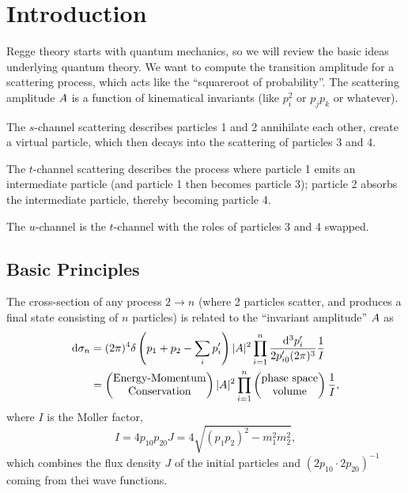 \chapter{Introduction}


\M
Regge theory starts with quantum mechanics, so we will review the basic
ideas underlying quantum theory. We want to compute the transition
amplitude for a scattering process, which acts like the ``squareroot of
probability''. The scattering amplitude $A$ is a function of
kinematical invariants (like $p_{i}^{2}$ or $p_{j}p_{k}$ or whatever).

The $s$-channel scattering describes particles 1 and 2 annihilate each
other, create a virtual particle, which then decays into the scattering
of particles 3 and 4.

The $t$-channel scattering describes the process where particle 1 emits
an intermediate particle (and particle 1 then becomes particle 3);
particle 2 absorbs the intermediate particle, thereby becoming particle
4.

The $u$-channel is the $t$-channel with the roles of particles 3 and 4
swapped.
\section{Basic Principles}

\M
The cross-section of any process $2\to n$ (where 2 particles scatter,
and produces a final state consisting of $n$ particles) is related to
the ``invariant amplitude'' $A$ as
\begin{equation}
  \begin{split}
\mathrm{d}\sigma_{n} &= (2\pi)^{4}\delta\left(p_{1}+p_{2}-\sum_{i}p_{i}'\right)|A|^{2}
\prod^{n}_{i=1}\frac{\mathrm{d}^{3}p'_{i}}{2p'_{i0}(2\pi)^{3}}\frac{1}{I}\\
&=\begin{pmatrix}\mbox{Energy-Momentum}\\
\mbox{Conservation}
\end{pmatrix}|A|^{2}\prod^{n}_{i=1}\begin{pmatrix}\mbox{phase space}\\
\mbox{volume}
\end{pmatrix}\frac{1}{I},
  \end{split}
  \end{equation}
where $I$ is the Moller factor,
\begin{equation}
I = 4p_{10}p_{20}J = 4\sqrt{(p_{1}p_{2})^{2} - m_{1}^{2}m_{2}^{2}},
\end{equation}
which combines the flux density $J$ of the initial particles and
$(2p_{10}\cdot2p_{20})^{-1}$ coming from thei wave functions.


